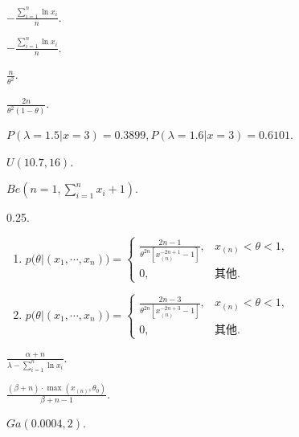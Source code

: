 \begin{answer}
  \setcounter{enumi}{5}
  \item \begin{enumerate*}
    \item $-\frac{\sum_{i=1}^n\ln x_i}n$.
    \item $-\frac{\sum_{i=1}^n\ln x_i}n$.
  \end{enumerate*}
  \item $\frac n{\theta^2}$.
  \item $\frac{2n}{\theta^2(1-\theta)}$.
\end{answer}

\begin{answer}
  \item $P(\lambda=1.5|x=3)=0.3899,P(\lambda=1.6|x=3)
  =0.6101$.
  \item $U(10.7,16)$.
  \item \begin{enumerate*}
    \item $Be\left(n=1,\sum_{i=1}^nx_i+1\right)$.
    \item 0.25.
  \end{enumerate*}
  \setcounter{enumi}{5}
  \item \begin{enumerate}
    \item $p\big(\theta|(x_1,\cdots,x_n)\big)=
    \begin{cases}
      \frac{2n-1}{\theta^{2n}[x_{(n)}^{-2n+1}-1]}, & x_{(n)}<\theta<1 , \\
      0, & \text{其他}.
    \end{cases}$
    \item $p\big(\theta|(x_1,\cdots,x_n)\big)=
    \begin{cases}
      \frac{2n-3}{\theta^{2n}[x_{(n)}^{-2n+3}-1]}, & x_{(n)}<\theta<1 , \\
      0, & \text{其他}.
    \end{cases}$
  \end{enumerate}
  \item $\frac{\alpha+n}{\lambda-\sum_{i=1}^n\ln x_i}$.
  \item \begin{enumerate*}
    \item $\frac{(\beta+n)\cdot\max(x_{(n)},\theta_0)}{\beta+n-1}$.
  \end{enumerate*}
  \item $Ga(0.0004,2)$.
\end{answer}

